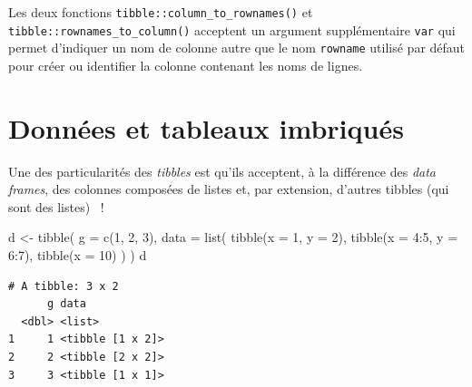 \documentclass[
  letterpaper,
  DIV=11,
  numbers=noendperiod,
  oneside]{scrreprt}
\newenvironment{Shaded}{\begin{snugshade}}{\end{snugshade}}
\newcommand{\AttributeTok}[1]{\textcolor[rgb]{0.40,0.45,0.13}{#1}}
\newcommand{\DecValTok}[1]{\textcolor[rgb]{0.68,0.00,0.00}{#1}}
\newcommand{\FunctionTok}[1]{\textcolor[rgb]{0.28,0.35,0.67}{#1}}
\newcommand{\NormalTok}[1]{\textcolor[rgb]{0.00,0.23,0.31}{#1}}
\newcommand{\OtherTok}[1]{\textcolor[rgb]{0.00,0.23,0.31}{#1}}
\newcommand{\SpecialCharTok}[1]{\textcolor[rgb]{0.37,0.37,0.37}{#1}}
\begin{document}
\begin{tcolorbox}[enhanced jigsaw, colbacktitle=quarto-callout-note-color!10!white, opacityback=0, toprule=.15mm, colback=white, coltitle=black, bottomtitle=1mm, toptitle=1mm, titlerule=0mm, rightrule=.15mm, title=\textcolor{quarto-callout-note-color}{\faInfo}\hspace{0.5em}{Note}, breakable, bottomrule=.15mm, opacitybacktitle=0.6, arc=.35mm, left=2mm, leftrule=.75mm, colframe=quarto-callout-note-color-frame]

Les deux fonctions \texttt{tibble::column\_to\_rownames()} et
\texttt{tibble::rownames\_to\_column()} acceptent un argument
supplémentaire \texttt{var} qui permet d'indiquer un nom de colonne
autre que le nom \texttt{rowname} utilisé par défaut pour créer ou
identifier la colonne contenant les noms de lignes.

\end{tcolorbox}

\hypertarget{donnuxe9es-et-tableaux-imbriquuxe9s}{%
\section{Données et tableaux
imbriqués}\label{donnuxe9es-et-tableaux-imbriquuxe9s}}

Une des particularités des \emph{tibbles} est qu'ils acceptent, à la
différence des \emph{data frames}, des colonnes composées de listes et,
par extension, d'autres tibbles (qui sont des listes) ~!

\begin{Shaded}
\begin{Highlighting}[]
\NormalTok{d }\OtherTok{\textless{}{-}} \FunctionTok{tibble}\NormalTok{(}
  \AttributeTok{g =} \FunctionTok{c}\NormalTok{(}\DecValTok{1}\NormalTok{, }\DecValTok{2}\NormalTok{, }\DecValTok{3}\NormalTok{),}
  \AttributeTok{data =} \FunctionTok{list}\NormalTok{(}
    \FunctionTok{tibble}\NormalTok{(}\AttributeTok{x =} \DecValTok{1}\NormalTok{, }\AttributeTok{y =} \DecValTok{2}\NormalTok{),}
    \FunctionTok{tibble}\NormalTok{(}\AttributeTok{x =} \DecValTok{4}\SpecialCharTok{:}\DecValTok{5}\NormalTok{, }\AttributeTok{y =} \DecValTok{6}\SpecialCharTok{:}\DecValTok{7}\NormalTok{),}
    \FunctionTok{tibble}\NormalTok{(}\AttributeTok{x =} \DecValTok{10}\NormalTok{)}
\NormalTok{  )}
\NormalTok{)}
\NormalTok{d}
\end{Highlighting}
\end{Shaded}

\begin{verbatim}
# A tibble: 3 x 2
      g data            
  <dbl> <list>          
1     1 <tibble [1 x 2]>
2     2 <tibble [2 x 2]>
3     3 <tibble [1 x 1]>
\end{verbatim}
\end{document}
